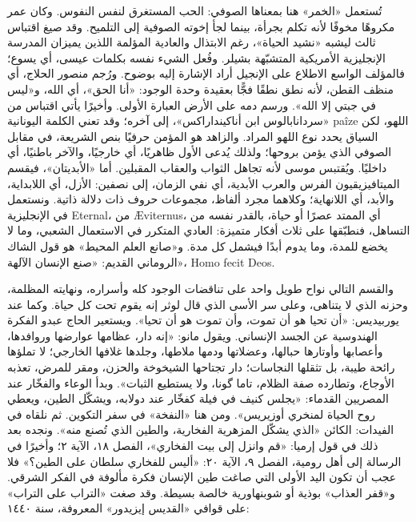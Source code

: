 تُستعمل «الخمر» هنا بمعناها الصوفي: الحب المستغرق لنفس النفوس. وكان عمر مكروهًا مخوفًا لأنه تكلم بجرأة، بينما لجأ إخوته الصوفية إلى التلميح. وقد صيغ اقتباس ثالث ليشبه «نشيد الحياة»، رغم الابتذال والعادية المؤلمة اللذين يميزان المدرسة الإنجليزية الأمريكية المتشبّهة بشيلر. وفُعل الشيء نفسه بكلمات عيسى، أي يسوع؛ فالمؤلف الواسع الاطلاع على الإنجيل أراد الإشارة إليه بوضوح. ورُجم منصور الحلاج، أي منظف القطن، لأنه نطق نطقًا فجًّا بعقيدة وحدة الوجود: «أنا الحق»، أي الله، و«ليس في جبتي إلا الله». ورسم دمه على الأرض العبارة الأولى. وأخيرًا يأتي اقتباس من «سردانابالوس ابن أناكينداراكس»، إلى آخره؛ وقد تعني الكلمة اليونانية \textenglish{paîze} اللهو، لكن السياق يحدد نوع اللهو المراد. والزاهد هو المؤمن حرفيًا بنص الشريعة، في مقابل الصوفي الذي يؤمن بروحها؛ ولذلك يُدعى الأول ظاهريًا، أي خارجيًا، والآخر باطنيًا، أي داخليًا. ويُقتبس موسى لأنه تجاهل الثواب والعقاب المقبلين. أما «الأبديتان»، فيقسم الميتافيزيقيون الفرس والعرب الأبدية، أي نفي الزمان، إلى نصفين: الأزل، أي اللابداية، والأبد، أي اللانهاية؛ وكلاهما مجرد ألفاظ، مجموعات حروف ذات دلالة ذاتية. ونستعمل في الإنجليزية \textenglish{Eternal}، من \textenglish{Æviternus}، أي الممتد عصرًا أو حياة، بالقدر نفسه من التساهل، فنطبّقها على ثلاث أفكار متميزة: العادي المتكرر في الاستعمال الشعبي، وما لا يخضع للمدة، وما يدوم أبدًا فيشمل كل مدة. و«صانع العلم المحيط» هو قول الشاك الروماني القديم: «صنع الإنسان الآلهة»، \textenglish{Homo fecit Deos}.

والقسم التالي نواح طويل واحد على تناقضات الوجود كله وأسراره، ونهايته المظلمة، وحزنه الذي لا يتناهى، وعلى سر الأسى الذي قال لوثر إنه يقوم تحت كل حياة. وكما عند يوربيديس: «أن تحيا هو أن تموت، وأن تموت هو أن تحيا». ويستعير الحاج عبدو الفكرة الهندوسية عن الجسد الإنساني. ويقول مانو: «إنه دار، عظامها عوارضها وروافدها، وأعصابها وأوتارها حبالها، وعضلاتها ودمها ملاطها، وجلدها غلافها الخارجي؛ لا تملؤها رائحة طيبة، بل تثقلها النجاسات؛ دار تجتاحها الشيخوخة والحزن، ومقر للمرض، تعذبه الأوجاع، وتطارده صفة الظلام، تاما گونا، ولا يستطيع الثبات». وبدأ الوعاء والفخّار عند المصريين القدماء: «يجلس كنيف في فيلة كفخّار عند دولابه، ويشكّل الطين، ويعطي روح الحياة لمنخري أوزيريس». ومن هنا «النفخة» في سفر التكوين. ثم نلقاه في الفيدات: الكائن «الذي يشكّل المزهرية الفخارية، والطين الذي تُصنع منه». ونجده بعد ذلك في قول إرميا: «قم وانزل إلى بيت الفخاري»، الفصل ١٨، الآية ٢؛ وأخيرًا في الرسالة إلى أهل رومية، الفصل ٩، الآية ٢٠: «أليس للفخاري سلطان على الطين؟» فلا عجب أن تكون اليد الأولى التي صاغت طين الإنسان فكرة مألوفة في الفكر الشرقي. و«قفر العذاب» بوذية أو شوبنهاورية خالصة بسيطة. وقد صغت «التراب على التراب» على قوافي «القديس إيزيدور» المعروفة، سنة ١٤٤٠:

